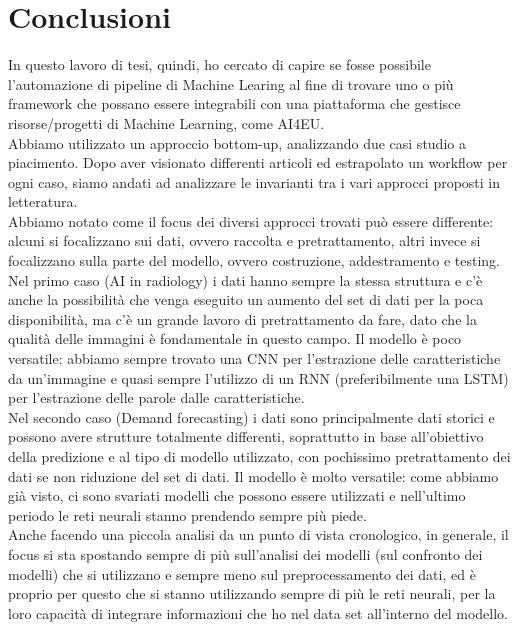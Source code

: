\documentclass[12pt,a4paper]{report}
\begin{document}
\chapter{Conclusioni}
In questo lavoro di tesi, quindi, ho cercato di capire se fosse possibile l'automazione di pipeline di Machine Learing al fine di trovare uno o più framework che possano essere integrabili con una piattaforma che gestisce risorse/progetti di Machine Learning, come AI4EU.\\
Abbiamo utilizzato un approccio bottom-up, analizzando due casi studio a piacimento. Dopo aver visionato differenti articoli ed estrapolato un workflow per ogni caso, siamo andati ad analizzare le invarianti tra i vari approcci proposti in letteratura.\\
Abbiamo notato come il focus dei diversi approcci trovati può essere differente: alcuni si focalizzano sui dati, ovvero raccolta e pretrattamento, altri invece si focalizzano sulla parte del modello, ovvero costruzione, addestramento e testing.\\
Nel primo caso (AI in radiology) i dati hanno sempre la stessa struttura e c'è anche la possibilità che venga eseguito un aumento del set di dati per la poca disponibilità, ma c'è un grande lavoro di pretrattamento da fare, dato che la qualità delle immagini è fondamentale in questo campo. Il modello è poco versatile: abbiamo sempre trovato una CNN per l'estrazione delle caratteristiche da un'immagine e quasi sempre l'utilizzo di un RNN (preferibilmente una LSTM) per l'estrazione delle parole dalle caratteristiche.\\
Nel secondo caso (Demand forecasting) i dati sono principalmente dati storici e possono avere strutture totalmente differenti, soprattutto in base all'obiettivo della predizione e al tipo di modello utilizzato, con pochissimo pretrattamento dei dati se non riduzione del set di dati. Il modello è molto versatile: come abbiamo già visto, ci sono svariati modelli che possono essere utilizzati e nell'ultimo periodo le reti neurali stanno prendendo sempre più piede.\\
Anche facendo una piccola analisi da un punto di vista cronologico, in generale, il focus si sta spostando sempre di più sull'analisi dei modelli (sul confronto dei modelli) che si utilizzano e sempre meno sul preprocessamento dei dati, ed è proprio per questo che si stanno utilizzando sempre di più le reti neurali, per la loro capacità di integrare informazioni che ho nel data set all'interno del modello.
\end{document}
